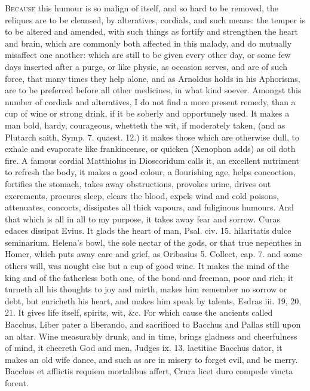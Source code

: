 \lettrine{B}{ecause} this humour is so malign of itself, and so hard to be removed,
the reliques are to be cleansed, by alteratives, cordials, and such
means: the temper is to be altered and amended, with such things as
fortify and strengthen the heart and brain, which are commonly
both affected in this malady, and do mutually misaffect one another:
which are still to be given every other day, or some few days inserted
after a purge, or like physic, as occasion serves, and are of such
force, that many times they help alone, and as Arnoldus holds in
his Aphorisms, are to be preferred before all other medicines, in what
kind soever.
Amongst this number of cordials and alteratives, I do not find a more
present remedy, than a cup of wine or strong drink, if it be soberly
and opportunely used. It makes a man bold, hardy, courageous,
whetteth the wit, if moderately taken, (and as Plutarch
saith, Symp. 7. quaest. 12.) it makes those which are otherwise
dull, to exhale and evaporate like frankincense, or quicken (Xenophon
adds) as oil doth fire. A famous cordial Matthiolus in
Dioscoridum calls it, an excellent nutriment to refresh the body, it
makes a good colour, a flourishing age, helps concoction, fortifies the
stomach, takes away obstructions, provokes urine, drives out
excrements, procures sleep, clears the blood, expels wind and cold
poisons, attenuates, concocts, dissipates all thick vapours, and
fuliginous humours. And that which is all in all to my purpose, it
takes away fear and sorrow. Curas edaces dissipat Evius. It glads
the heart of man, Psal. civ. 15. hilaritatis dulce seminarium. Helena's
bowl, the sole nectar of the gods, or that true nepenthes in
Homer, which puts away care and grief, as Oribasius 5. Collect,
cap. 7. and some others will, was nought else but a cup of good wine.
It makes the mind of the king and of the fatherless both one, of the
bond and freeman, poor and rich; it turneth all his thoughts to joy and
mirth, makes him remember no sorrow or debt, but enricheth his heart,
and makes him speak by talents, Esdras iii. 19, 20, 21. It gives life
itself, spirits, wit, \&c. For which cause the ancients called Bacchus,
Liber pater a liberando, and sacrificed to Bacchus and Pallas
still upon an altar. Wine measurably drunk, and in time, brings
gladness and cheerfulness of mind, it cheereth God and men, Judges ix.
13. laetitiae Bacchus dator, it makes an old wife dance, and such as
are in misery to forget evil, and be merry.
Bacchus et afflictis requiem mortalibus affert,
Crura licet duro compede vincta forent.

